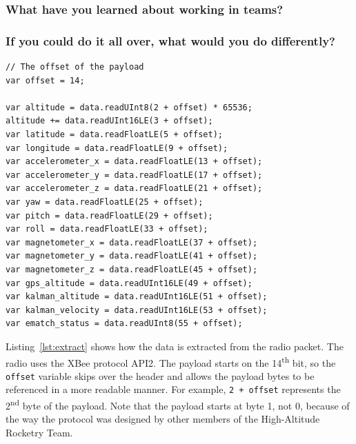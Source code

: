 \documentclass[10pt,draftclsnofoot,onecolumn]{IEEEtran}
\begin{document}
\subsubsection{What have you learned about working in teams?}
\subsubsection{If you could do it all over, what would you do differently?}


















\newpage
{}

\begin{lstlisting}[caption={Telemetry payload data extraction},label={lst:extract}]
// The offset of the payload
var offset = 14;

var altitude = data.readUInt8(2 + offset) * 65536;
altitude += data.readUInt16LE(3 + offset);
var latitude = data.readFloatLE(5 + offset);
var longitude = data.readFloatLE(9 + offset);
var accelerometer_x = data.readFloatLE(13 + offset);
var accelerometer_y = data.readFloatLE(17 + offset);
var accelerometer_z = data.readFloatLE(21 + offset);
var yaw = data.readFloatLE(25 + offset);
var pitch = data.readFloatLE(29 + offset);
var roll = data.readFloatLE(33 + offset);
var magnetometer_x = data.readFloatLE(37 + offset);
var magnetometer_y = data.readFloatLE(41 + offset);
var magnetometer_z = data.readFloatLE(45 + offset);
var gps_altitude = data.readUInt16LE(49 + offset);
var kalman_altitude = data.readUInt16LE(51 + offset);
var kalman_velocity = data.readUInt16LE(53 + offset);
var ematch_status = data.readUInt8(55 + offset);
\end{lstlisting}

Listing~\ref{lst:extract} shows how the data is extracted from the radio packet.
The radio uses the XBee protocol API2.
The payload starts on the 14\textsuperscript{th} bit, so the \texttt{offset} variable skips
over the header and allows the payload bytes to be referenced in a more readable manner.
For example, \texttt{2 + offset} represents the 2\textsuperscript{nd} byte of the payload.
Note that the payload starts at byte 1, not 0, because of the way the protocol was designed by other members of the High-Altitude Rocketry Team.
\end{document}
